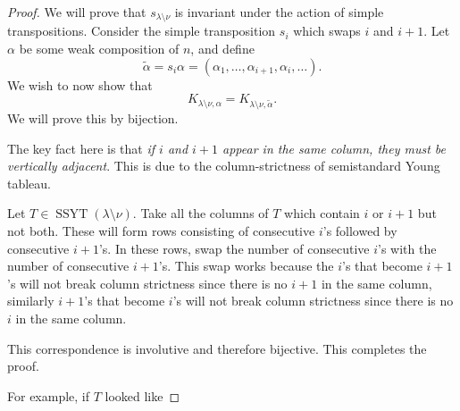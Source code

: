 \documentclass{article}
\DeclareMathOperator{\SSYT}{SSYT}
\begin{document}
\begin{proof}
    We will prove that $s_{\lambda\setminus\nu}$ is invariant under the action of simple transpositions. 
    Consider the simple transposition $s_i$ which swaps $i$ and $i+1$. 
    Let $\alpha$ be some weak composition of $n$, and define
    \[
        \tilde{\alpha} = s_i\alpha = (\alpha_1, \ldots, \alpha_{i+1}, \alpha_i, \ldots).
    \]
    We wish to now show that 
    \[
        K_{\lambda\setminus\nu,\alpha} = K_{\lambda\setminus\nu,\tilde{\alpha}}.
    \]
    We will prove this by bijection.

    The key fact here is that \textit{if $i$ and $i+1$ appear in the same column, they must be vertically adjacent}. 
    This is due to the column-strictness of semistandard Young tableau.

    Let $T\in\SSYT(\lambda \setminus \nu)$. 
    Take all the columns of $T$ which contain $i$ or $i+1$ but not both. 
    These will form rows consisting of consecutive $i$'s followed by consecutive $i+1$'s. 
    In these rows, swap the number of consecutive $i$'s with the number of consecutive $i+1$'s. 
    This swap works because the $i$'s that become $i+1$'s will not break column strictness since there is no $i+1$ in the same column, similarly $i+1$'s that become $i$'s will not break column strictness since there is no $i$ in the same column.

    This correspondence is involutive and therefore bijective. This completes the proof.

    For example, if $T$ looked like


\end{proof}
\end{document}
